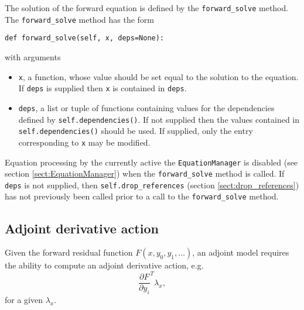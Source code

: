 \documentclass[11pt]{article}
\begin{document}
The solution of the forward equation is defined by the \texttt{forward\_solve}
method. The \texttt{forward\_solve} method has the form
\begin{lstlisting}
def forward_solve(self, x, deps=None):
\end{lstlisting}
with arguments
\begin{itemize}
  \item \texttt{x}, a function, whose value should be set equal to the solution
    to the equation. If \texttt{deps} is supplied then \texttt{x} is contained
    in \texttt{deps}.
  \item \texttt{deps}, a list or tuple of functions containing values for the
    dependencies defined by \texttt{self.dependencies()}. If not supplied then
    the values contained in \texttt{self.dependencies()} should be used. If
    supplied, only the entry corresponding to \texttt{x} may be modified.
\end{itemize}

Equation processing by the currently active the \texttt{EquationManager} is
disabled (see section \ref{sect:EquationManager}) when the
\texttt{forward\_solve} method is called. If \texttt{deps} is not supplied,
then \texttt{self.drop\_references} (section \ref{sect:drop_references}) has
not previously been called prior to a call to the \texttt{forward\_solve}
method.

\subsection{Adjoint derivative action}\label{sect:adjoint_derivative_action}

Given the forward residual function $F \left( x, y_0, y_1, \ldots \right)$, an
adjoint model requires the ability to compute an adjoint derivative action,
e.g.
\begin{equation*}
  \frac{\partial F}{\partial y_i}^T \lambda_x,
\end{equation*}
for a given $\lambda_x$.
\end{document}
